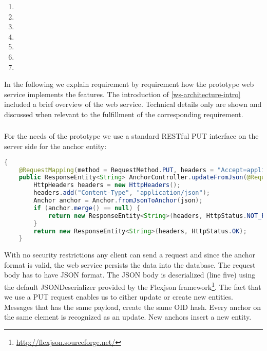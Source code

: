 \begin{enumerate}
\item \reqWSi
\item \reqWSii
\item \reqWSiii
\item \reqWSiv
\item \reqWSv
\item \reqWSvi
\item \reqWSvii
\end{enumerate}

In the following we explain requirement by requirement how the prototype web service implements the features. The introduction of \ref{ws-architecture-intro} included a brief overview of the web service. Technical details only are shown and discussed when relevant to the fulfillment of the corresponding requirement.

\subsubsection[Incoming Messages]{\reqWSi}

For the needs of the prototype we use a standard RESTful PUT interface on the server side for the anchor entity:

\begin{lstlisting}[language=Java]
{
    @RequestMapping(method = RequestMethod.PUT, headers = "Accept=application/json")
    public ResponseEntity<String> AnchorController.updateFromJson(@RequestBody String json) {
        HttpHeaders headers = new HttpHeaders();
        headers.add("Content-Type", "application/json");
        Anchor anchor = Anchor.fromJsonToAnchor(json);
        if (anchor.merge() == null) {
            return new ResponseEntity<String>(headers, HttpStatus.NOT_FOUND);
        }
        return new ResponseEntity<String>(headers, HttpStatus.OK);
    }
\end{lstlisting}

With no security restrictions any client can send a request and since the anchor format is valid, the web service persists the data into the database. The request body has to have JSON format. The JSON body is deserialized (line five) using the default JSONDeserializer provided by the Flexjson framework\footnote{\url{http://flexjson.sourceforge.net/}}. The fact that we use a PUT request enables us to either update or create new entities. Messages that has the same payload, create the same OID hash. Every anchor on the same element is recognized as an update. New anchors insert a new entity. 

